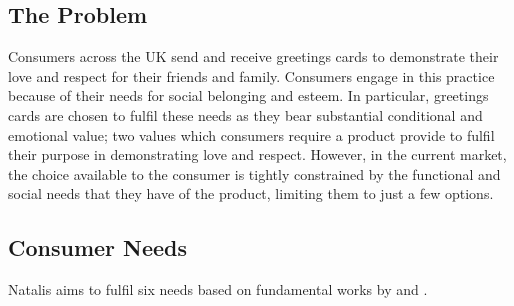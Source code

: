 \subsection*{The Problem}
Consumers across the UK send and receive greetings cards to demonstrate their love and respect for their friends and family. Consumers engage in this practice because of their needs for social belonging and esteem. In particular, greetings cards are chosen to fulfil these needs as they bear substantial conditional and emotional value; two values which consumers require a product provide to fulfil their purpose in demonstrating love and respect. However, in the current market, the choice available to the consumer is tightly constrained by the functional and social needs that they have of the product, limiting them to just a few options.
\subsection*{Consumer Needs}
Natalis aims to fulfil six needs based on fundamental works by \citet{maslow1943theory} and \citet{sheth1991we}.
